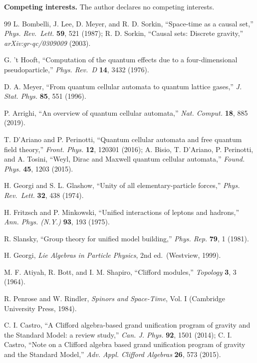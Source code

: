 \documentclass[aps,prd,twocolumn,amsmath,amssymb,superscriptaddress,nofootinbib,floatfix]{revtex4-2}
\begin{document}
\textbf{Competing interests.} The author declares no competing
interests.

\begin{thebibliography}{99}
 L. Bombelli, J. Lee, D. Meyer, and R. D. Sorkin, ``Space-time as a
causal set,'' \emph{Phys. Rev.~Lett.} \textbf{59}, 521 (1987); R. D.
Sorkin, ``Causal sets: Discrete gravity,'' \emph{arXiv:gr-qc/0309009}
(2003).

 G. 't Hooft, ``Computation of the quantum effects due to a
four-dimensional pseudoparticle,'' \emph{Phys. Rev.~D} \textbf{14}, 3432
(1976).

 D. A. Meyer, ``From quantum cellular automata to quantum lattice
gases,'' \emph{J. Stat. Phys.} \textbf{85}, 551 (1996).

 P. Arrighi, ``An overview of quantum cellular automata,'' \emph{Nat.
Comput.} \textbf{18}, 885 (2019).

 T. D'Ariano and P. Perinotti, ``Quantum cellular automata and free
quantum field theory,'' \emph{Front. Phys.} \textbf{12}, 120301 (2016);
A. Bisio, T. D'Ariano, P. Perinotti, and A. Tosini, ``Weyl, Dirac and
Maxwell quantum cellular automata,'' \emph{Found. Phys.} \textbf{45},
1203 (2015).

 H. Georgi and S. L. Glashow, ``Unity of all elementary-particle
forces,'' \emph{Phys. Rev.~Lett.} \textbf{32}, 438 (1974).

 H. Fritzsch and P. Minkowski, ``Unified interactions of leptons and
hadrons,'' \emph{Ann. Phys. (N.Y.)} \textbf{93}, 193 (1975).

 R. Slansky, ``Group theory for unified model building,'' \emph{Phys.
Rep.} \textbf{79}, 1 (1981).

 H. Georgi, \emph{Lie Algebras in Particle Physics}, 2nd ed.~(Westview,
1999).

 M. F. Atiyah, R. Bott, and I. M. Shapiro, ``Clifford modules,''
\emph{Topology} \textbf{3}, 3 (1964).

 R. Penrose and W. Rindler, \emph{Spinors and Space-Time}, Vol. I
(Cambridge University Press, 1984).

 C. I. Castro, ``A Clifford algebra-based grand unification program of
gravity and the Standard Model: a review study,'' \emph{Can. J. Phys.}
\textbf{92}, 1501 (2014); C. I. Castro, ``Note on a Clifford algebra
based grand unification program of gravity and the Standard Model,''
\emph{Adv. Appl. Clifford Algebras} \textbf{26}, 573 (2015).


\end{thebibliography}
\end{document}
